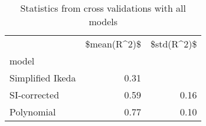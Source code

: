 
\begin{table}[H]
    \centering
    \caption{Statistics from cross validations with all models}
   \begin{tabular}{lrr}
\toprule
{} &  \$mean(R\textasciicircum 2)\$ &  \$std(R\textasciicircum 2)\$ \\
model            &              &             \\
\midrule
Simplified Ikeda &         0.31 &             \\
SI-corrected     &         0.59 &        0.16 \\
Polynomial       &         0.77 &        0.10 \\
\bottomrule
\end{tabular}

    \label{tab:crossvalidation}
\end{table}
    